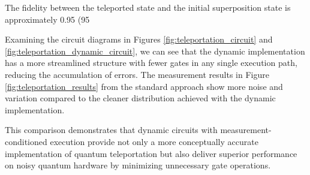 \documentclass[12pt,a4paper]{article}
\begin{document}
The fidelity between the teleported state and the initial superposition state is approximately 0.95 (95%

Examining the circuit diagrams in Figures \ref{fig:teleportation_circuit} and \ref{fig:teleportation_dynamic_circuit}, we can see that the dynamic implementation has a more streamlined structure with fewer gates in any single execution path, reducing the accumulation of errors. The measurement results in Figure \ref{fig:teleportation_results} from the standard approach show more noise and variation compared to the cleaner distribution achieved with the dynamic implementation.

This comparison demonstrates that dynamic circuits with measurement-conditioned execution provide not only a more conceptually accurate implementation of quantum teleportation but also deliver superior performance on noisy quantum hardware by minimizing unnecessary gate operations.
\end{document}
